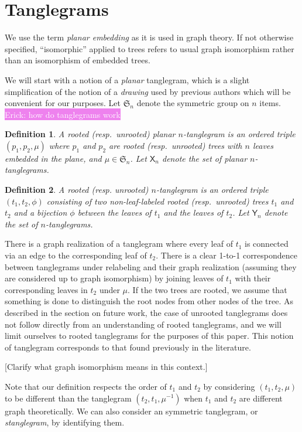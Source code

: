 \documentclass{amsart}
\newtheorem{definition}{Definition}
\newcommand{\fS}{\mathfrak S}
\newcommand{\pairing}{\mu}
\newcommand{\ptangle}{\mathsf{X}}
\newcommand{\tangle}{\mathsf{Y}}
\newcommand{\EM}[1]{\colorbox{violet}{\textcolor{white}{Erick: #1}}}
\begin{document}
\section{Tanglegrams}
We use the term \emph{planar embedding} as it is used in graph theory.
If not otherwise specified, ``isomorphic'' applied to trees refers to usual graph isomorphism rather than an isomorphism of embedded trees.

We will start with a notion of a \emph{planar} tanglegram, which is a slight simplification of the notion of a \emph{drawing} used by previous authors \cite{Venkatachalam2010-zh} which will be convenient for our purposes.
Let $\fS_n$ denote the symmetric group on $n$ items.
\EM{how do tanglegrams work}
\begin{definition}
\label{def:ptanglegram}
A rooted (resp.\ unrooted) \emph{planar $n$-tanglegram} is an ordered triple $(p_1, p_2, \pairing)$ where $p_1$ and $p_2$ are rooted (resp.\ unrooted) trees with $n$ leaves embedded in the plane, and $\pairing \in \fS_n$.
Let $\ptangle_n$ denote the set of planar $n$-tanglegrams.
\end{definition}


\begin{definition}
\label{def:tanglegram}
A rooted (resp. unrooted) $n$-\emph{tanglegram} is an ordered triple $(t_1, t_2, \phi)$ consisting of two non-leaf-labeled rooted (resp.\ unrooted) trees $t_1$ and $t_2$ and a bijection $\phi$ between the leaves of $t_1$ and the leaves of $t_2$.
Let $\tangle_n$ denote the set of $n$-tanglegrams.
\end{definition}
There is a graph realization of a tanglegram where every leaf of $t_1$ is connected via an edge to the corresponding leaf of $t_2$.
There is a clear 1-to-1 correspondence between tanglegrams under relabeling and their graph realization (assuming they are considered up to graph isomorphism) by joining leaves of $t_1$ with their corresponding leaves in $t_2$ under $\pairing$.
If the two trees are rooted, we assume that something is done to distinguish the root nodes from other nodes of the tree.
As described in the section on future work, the case of unrooted tanglegrams does not follow directly from an understanding of rooted tanglegrams, and we will limit ourselves to rooted tanglegrams for the purposes of this paper.
This notion of tanglegram corresponds to that found previously in the literature.

[Clarify what graph isomorphism means in this context.]

Note that our definition respects the order of $t_1$ and $t_2$ by considering $(t_1, t_2, \pairing)$ to be different than the tanglegram $(t_2, t_1, \pairing^{-1})$ when $t_1$ and $t_2$ are different graph theoretically.
We can also consider an symmetric tanglegram, or \emph{stanglegram}, by identifying them.
\end{document}
